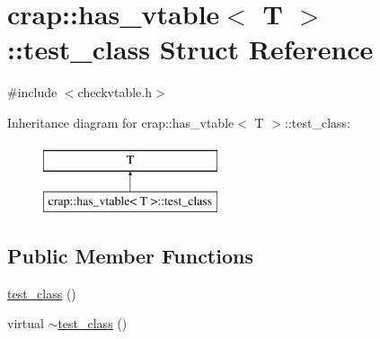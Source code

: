 \hypertarget{structcrap_1_1has__vtable_1_1test__class}{\section{crap\-:\-:has\-\_\-vtable$<$ T $>$\-:\-:test\-\_\-class Struct Reference}
\label{structcrap_1_1has__vtable_1_1test__class}
}


{\ttfamily \#include $<$checkvtable.\-h$>$}

Inheritance diagram for crap\-:\-:has\-\_\-vtable$<$ T $>$\-:\-:test\-\_\-class\-:\begin{figure}[H]
\begin{center}
\leavevmode
\includegraphics[height=2.000000cm]{structcrap_1_1has__vtable_1_1test__class}
\end{center}
\end{figure}
\subsection*{Public Member Functions}
\begin{DoxyCompactItemize}
\item 
\hyperlink{structcrap_1_1has__vtable_1_1test__class_a6e4ee5125a96ae1e7d9ca1c64c4cd8fe}{test\-\_\-class} ()
\item 
virtual \hyperlink{structcrap_1_1has__vtable_1_1test__class_ac1ec56b0a5223d91214a50cba6acd28f}{$\sim$test\-\_\-class} ()
\end{DoxyCompactItemize}



